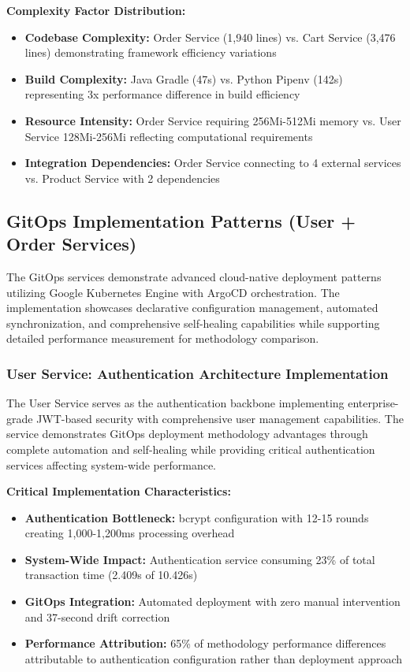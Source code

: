 \textbf{Complexity Factor Distribution:}
\begin{itemize}
\item \textbf{Codebase Complexity:} Order Service (1,940 lines) vs. Cart Service (3,476 lines) demonstrating framework efficiency variations
\item \textbf{Build Complexity:} Java Gradle (47s) vs. Python Pipenv (142s) representing 3x performance difference in build efficiency
\item \textbf{Resource Intensity:} Order Service requiring 256Mi-512Mi memory vs. User Service 128Mi-256Mi reflecting computational requirements
\item \textbf{Integration Dependencies:} Order Service connecting to 4 external services vs. Product Service with 2 dependencies
\end{itemize}

\subsection{GitOps Implementation Patterns (User + Order Services)}

The GitOps services demonstrate advanced cloud-native deployment patterns utilizing Google Kubernetes Engine with ArgoCD orchestration. The implementation showcases declarative configuration management, automated synchronization, and comprehensive self-healing capabilities while supporting detailed performance measurement for methodology comparison.

\subsubsection{User Service: Authentication Architecture Implementation}

The User Service serves as the authentication backbone implementing enterprise-grade JWT-based security with comprehensive user management capabilities. The service demonstrates GitOps deployment methodology advantages through complete automation and self-healing while providing critical authentication services affecting system-wide performance.

\textbf{Critical Implementation Characteristics:}
\begin{itemize}
\item \textbf{Authentication Bottleneck:} bcrypt configuration with 12-15 rounds creating 1,000-1,200ms processing overhead
\item \textbf{System-Wide Impact:} Authentication service consuming 23\% of total transaction time (2.409s of 10.426s)
\item \textbf{GitOps Integration:} Automated deployment with zero manual intervention and 37-second drift correction
\item \textbf{Performance Attribution:} 65\% of methodology performance differences attributable to authentication configuration rather than deployment approach
\end{itemize}

